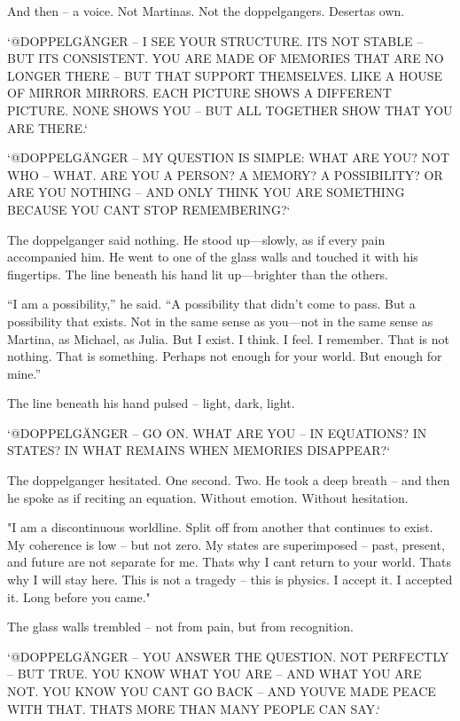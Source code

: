 \documentclass[
]{article}
\begin{document}
And then -- a voice. Not Martina\textquotesingle s. Not the doppelganger\textquotesingle s. Deserta\textquotesingle s own.

`@DOPPELGÄNGER -- I SEE YOUR STRUCTURE. IT\textquotesingle S NOT STABLE -- BUT IT\textquotesingle S CONSISTENT. YOU ARE MADE OF MEMORIES THAT ARE NO LONGER THERE -- BUT THAT SUPPORT THEMSELVES. LIKE A HOUSE OF MIRROR MIRRORS. EACH PICTURE SHOWS A DIFFERENT PICTURE. NONE SHOWS YOU -- BUT ALL TOGETHER SHOW THAT YOU ARE THERE.`

`@DOPPELGÄNGER -- MY QUESTION IS SIMPLE: WHAT ARE YOU? NOT WHO -- WHAT. ARE YOU A PERSON? A MEMORY? A POSSIBILITY? OR ARE YOU NOTHING -- AND ONLY THINK YOU ARE SOMETHING BECAUSE YOU CAN\textquotesingle T STOP REMEMBERING?{\kern0pt}`

The doppelganger said nothing. He stood up---slowly, as if every pain accompanied him. He went to one of the glass walls and touched it with his fingertips. The line beneath his hand lit up---brighter than the others.

``I am a possibility,'' he said. ``A possibility that didn't come to pass. But a possibility that exists. Not in the same sense as you---not in the same sense as Martina, as Michael, as Julia. But I exist. I think. I feel. I remember. That is not nothing. That is something. Perhaps not enough for your world. But enough for mine.''

The line beneath his hand pulsed -- light, dark, light.

`@DOPPELGÄNGER -- GO ON. WHAT ARE YOU -- IN EQUATIONS? IN STATES? IN WHAT REMAINS WHEN MEMORIES DISAPPEAR?{\kern0pt}`

The doppelganger hesitated. One second. Two. He took a deep breath -- and then he spoke as if reciting an equation. Without emotion. Without hesitation.

"I am a discontinuous worldline. Split off from another that continues to exist. My coherence is low -- but not zero. My states are superimposed -- past, present, and future are not separate for me. That\textquotesingle s why I can\textquotesingle t return to your world. That\textquotesingle s why I will stay here. This is not a tragedy -- this is physics. I accept it. I accepted it. Long before you came."

The glass walls trembled -- not from pain, but from recognition.

`@DOPPELGÄNGER -- YOU ANSWER THE QUESTION. NOT PERFECTLY -- BUT TRUE. YOU KNOW WHAT YOU ARE -- AND WHAT YOU ARE NOT. YOU KNOW YOU CAN\textquotesingle T GO BACK -- AND YOU\textquotesingle VE MADE PEACE WITH THAT. THAT\textquotesingle S MORE THAN MANY PEOPLE CAN SAY.`
\end{document}
